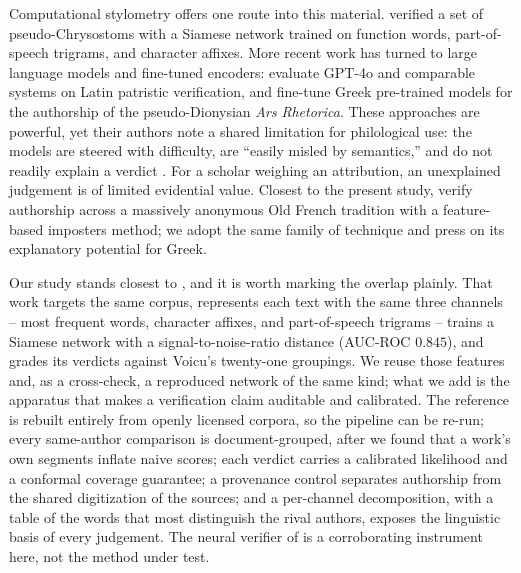 \documentclass{anthology-ch}
\begin{document}
Computational stylometry offers one route into this material. \textcite{clerice2023} verified a set of pseudo-Chrysostoms with a Siamese network trained on function words, part-of-speech trigrams, and character affixes. More recent work has turned to large language models and fine-tuned encoders: \textcite{gorovaia2024} evaluate GPT-4o and comparable systems on Latin patristic verification, and \textcite{schmidt2024} fine-tune Greek pre-trained models for the authorship of the pseudo-Dionysian \emph{Ars Rhetorica}. These approaches are powerful, yet their authors note a shared limitation for philological use: the models are steered with difficulty, are ``easily misled by semantics,'' and do not readily explain a verdict \cite{gorovaia2024}. For a scholar weighing an attribution, an unexplained judgement is of limited evidential value. Closest to the present study, \textcite{clerice2025} verify authorship across a massively anonymous Old French tradition with a feature-based imposters method; we adopt the same family of technique and press on its explanatory potential for Greek.

Our study stands closest to \textcite{clerice2023}, and it is worth marking the overlap plainly. That work targets the same corpus, represents each text with the same three channels -- most frequent words, character affixes, and part-of-speech trigrams -- trains a Siamese network with a signal-to-noise-ratio distance (AUC-ROC $0.845$), and grades its verdicts against Voicu's twenty-one groupings. We reuse those features and, as a cross-check, a reproduced network of the same kind; what we add is the apparatus that makes a verification claim auditable and calibrated. The reference is rebuilt entirely from openly licensed corpora, so the pipeline can be re-run; every same-author comparison is document-grouped, after we found that a work's own segments inflate naive scores; each verdict carries a calibrated likelihood and a conformal coverage guarantee; a provenance control separates authorship from the shared digitization of the sources; and a per-channel decomposition, with a table of the words that most distinguish the rival authors, exposes the linguistic basis of every judgement. The neural verifier of \textcite{clerice2023} is a corroborating instrument here, not the method under test.
\end{document}
